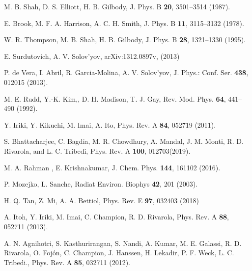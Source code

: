 \begin{thebibliography}{9}
M. B. Shah, D. S. Elliott, H. B. Gilbody,
J. Phys. B \textbf{20}, 3501--3514 (1987).

E. Brook, M. F. A. Harrison, A. C. H. Smith, 
J. Phys. B \textbf{11}, 3115--3132 (1978).

W. R. Thompson, M. B. Shah, H. B. Gilbody,
J. Phys. B \textbf{28}, 1321--1330 (1995).

E. Surdutovich, A. V. Solov'yov, 
arXiv:1312.0897v, (2013)

P. de Vera, I. Abril, R. Garcia-Molina, A. V. Solov'yov,
J. Phys.: Conf. Ser. \textbf{438}, 012015 (2013).

M. E. Rudd, Y.-K. Kim,, D. H. Madison, T. J. Gay,
Rev. Mod. Phys. \textbf{64}, 441--490 (1992).

Y. Iriki, Y. Kikuchi, M. Imai, A. Ito,
Phys. Rev. A \textbf{84}, 052719 (2011).

S. Bhattacharjee, C. Bagdia, M. R. Chowdhury, A. Mandal, J. M. Monti, 
R. D. Rivarola, and L. C. Tribedi, 
Phys. Rev. A \textbf{100}, 012703(2019).

M. A. Rahman , E. Krishnakumar,
J. Chem. Phys. \textbf{144}, 161102 (2016).

P. Mozejko, L. Sanche, 
Radiat Environ. Biophys \textbf{42}, 201 (2003).

H. Q. Tan, Z. Mi, A. A. Bettiol, 
Phys. Rev. E \textbf{97}, 032403 (2018)

A. Itoh, Y. Iriki, M. Imai, C. Champion, R. D. Rivarola, 
Phys. Rev. A \textbf{88}, 052711 (2013).

A. N. Agnihotri, S. Kasthurirangan, S. Nandi, A.
Kumar, M. E. Galassi, R. D. Rivarola, O. Foj\'{o}n, C. Champion, J. Hanssen,
H. Lekadir, P. F. Weck, L. C. Tribedi.,
Phys. Rev. A \textbf{85}, 032711 (2012).


\end{thebibliography}
